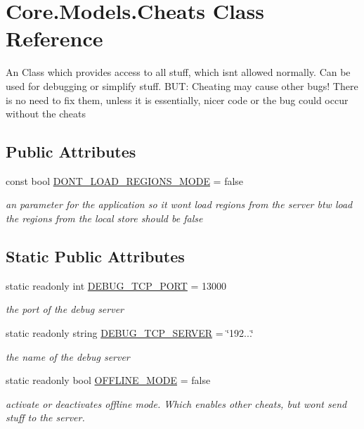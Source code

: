 \hypertarget{classCore_1_1Models_1_1Cheats}{}\section{Core.\+Models.\+Cheats Class Reference}
\label{classCore_1_1Models_1_1Cheats}


An Class which provides access to all stuff, which isn\textquotesingle{}t allowed normally. Can be used for debugging or simplify stuff. B\+U\+T\+: Cheating may cause other bugs! There is no need to fix them, unless it is essentially, nicer code or the bug could occur without the cheats  


\subsection*{Public Attributes}
\begin{DoxyCompactItemize}
\item 
const bool \hyperlink{classCore_1_1Models_1_1Cheats_a78e94d06892c42586bbae6e081389547}{D\+O\+N\+T\+\_\+\+L\+O\+A\+D\+\_\+\+R\+E\+G\+I\+O\+N\+S\+\_\+\+M\+O\+D\+E} = false
\begin{DoxyCompactList}\small\item\em an parameter for the application so it won\textquotesingle{}t load regions from the server btw load the regions from the local store should be false \end{DoxyCompactList}\end{DoxyCompactItemize}
\subsection*{Static Public Attributes}
\begin{DoxyCompactItemize}
\item 
static readonly int \hyperlink{classCore_1_1Models_1_1Cheats_a350ab15904dcc094785358b43aceff9c}{D\+E\+B\+U\+G\+\_\+\+T\+C\+P\+\_\+\+P\+O\+R\+T} = 13000
\begin{DoxyCompactList}\small\item\em the port of the debug server \end{DoxyCompactList}\item 
static readonly string \hyperlink{classCore_1_1Models_1_1Cheats_ae8f7144fe92f2f033128c1285f45d052}{D\+E\+B\+U\+G\+\_\+\+T\+C\+P\+\_\+\+S\+E\+R\+V\+E\+R} = \char`\"{}192...\char`\"{}
\begin{DoxyCompactList}\small\item\em the name of the debug server \end{DoxyCompactList}\item 
static readonly bool \hyperlink{classCore_1_1Models_1_1Cheats_a3010379c1c4ec330e482faed9f73bea8}{O\+F\+F\+L\+I\+N\+E\+\_\+\+M\+O\+D\+E} = false
\begin{DoxyCompactList}\small\item\em activate or deactivates offline mode. Which enables other cheats, but won\textquotesingle{}t send stuff to the server. \end{DoxyCompactList}\end{DoxyCompactItemize}



